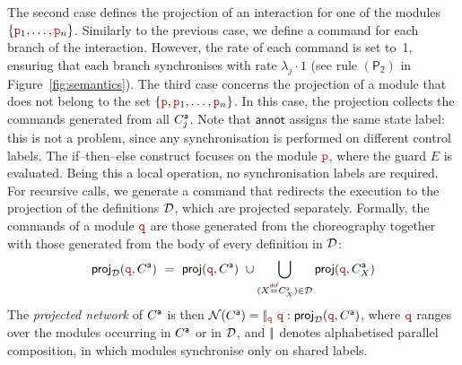 The second case defines the projection of an interaction for one of
the modules \( \{\role p_1, \ldots, \role p_n\} \). Similarly to the
previous case, we define a command for each branch of the
interaction. However, the rate of each command is set to~1, ensuring
that each branch synchronises with rate \( \lambda_j \cdot 1 \) (see
rule \( \mathsf{(P_2)} \) in Figure~\ref{fig:semantics}).
The third case concerns the projection of a module that does not
belong to the set \( \{\nr, \nr_1,\ldots,\nr_n\} \). In this case, the
projection collects the commands generated from all ${C}^{\mathsf a}_j$. Note
that $\mathsf{annot}$ assigns the same state label: this is not a
problem, since any synchronisation is performed on different control
labels.
The if--then--else construct focuses on the module \( \nr \), where
the guard \(E\) is evaluated. Being this a local operation, no
synchronisation labels are required. For recursive calls, we generate
a command that redirects the execution to the projection of the
definitions \(\mathcal D\), which are projected separately.
Formally, the commands of a module $\nrr$ are those generated
from the choreography together with those generated from the body of
every definition in $\mathcal D$:
\[
  \projD(\nrr,\anno C)\ =\ \proj(\nrr,\anno C)\ \cup
  \bigcup_{(X \defrec \anno C_X)\in\defin} \proj(\nrr,\anno C_X)
\]
The \emph{projected network} of ${C}^{\mathsf a}$ is then
$\mathcal N(\anno C) = \pp_{\nrr}\ \nrr:\projD(\nrr,\anno C)$, where
$\nrr$ ranges over the modules occurring in ${C}^{\mathsf a}$ or in $\mathcal D$,
and $|\!|$ denotes alphabetised parallel composition, in which modules
synchronise only on shared labels.

